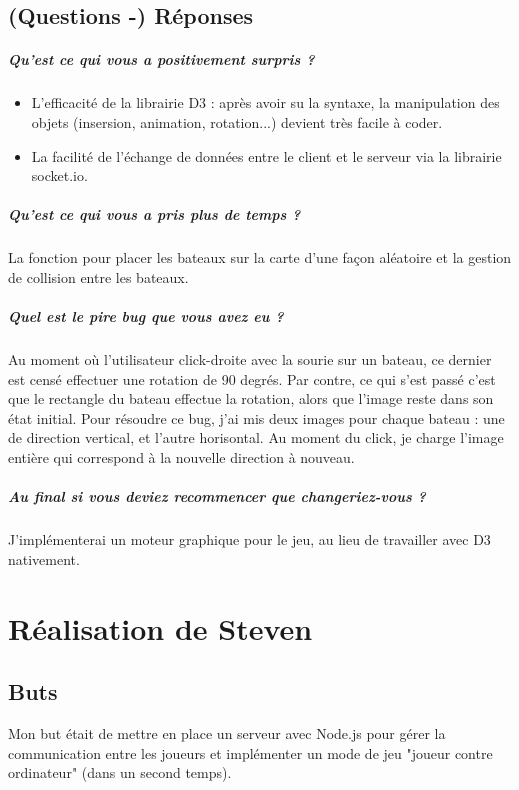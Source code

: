 \documentclass[a4paper, 11pt]{article}
\begin{document}
\subsection{(Questions -) Réponses}
\subparagraph{Qu’est ce qui vous a positivement surpris ?}
\begin{itemize}
\item L'efficacité de la librairie D3 : après avoir su la syntaxe, la manipulation des objets (insersion, animation, rotation...) devient très facile à coder.
\item La facilité de l'échange de données entre le client et le serveur via la librairie socket.io.
\end{itemize}
\subparagraph{Qu’est ce qui vous a pris plus de temps ?}
La fonction pour placer les bateaux sur la carte d'une façon aléatoire et la gestion de collision entre les bateaux.
\subparagraph{Quel est le pire bug que vous avez eu ?}
Au moment où l'utilisateur click-droite avec la sourie sur un bateau, ce dernier est censé effectuer une rotation de 90 degrés. Par contre, ce qui s'est passé c'est que
le rectangle du bateau effectue la rotation, alors que l'image reste dans son état initial. Pour résoudre ce bug, j'ai mis deux images pour chaque bateau : 
une de direction vertical, et l'autre horisontal. Au moment du click, je charge l'image entière qui correspond à la nouvelle direction à nouveau.
\subparagraph{Au final si vous deviez recommencer que changeriez-vous ?}
J'implémenterai un moteur graphique pour le jeu, au lieu de travailler avec D3 nativement.

\section{Réalisation de Steven}
\subsection{Buts}
Mon but était de mettre en place un serveur avec Node.js pour gérer la communication entre les joueurs et implémenter un mode de jeu "joueur contre ordinateur" (dans un second temps).
\end{document}
